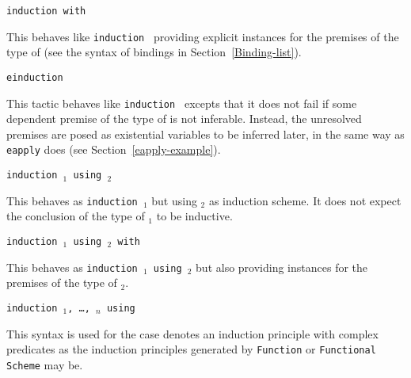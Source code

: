 \begin{coq_example*}
\begin{Variants}




\item{\tt induction {\term} with \bindinglist}

  This behaves like \texttt{induction {\term}} providing explicit
  instances for the premises of the type of {\term} (see the syntax of
  bindings in Section~\ref{Binding-list}).

\item{\tt einduction {\term}}

  This tactic behaves like \texttt{induction {\term}} excepts that it
  does not fail if some dependent premise of the type of {\term} is
  not inferable. Instead, the unresolved premises are posed as
  existential variables to be inferred later, in the same way as {\tt
  eapply} does (see Section~\ref{eapply-example}).

\item {\tt induction {\term$_1$} using {\term$_2$}}

  This behaves as {\tt induction {\term$_1$}} but using {\term$_2$} as
  induction scheme. It does not expect the conclusion of the type of
  {\term$_1$} to be inductive.

\item {\tt induction {\term$_1$} using {\term$_2$} with {\bindinglist}}

  This behaves as {\tt induction {\term$_1$} using {\term$_2$}} but
  also providing instances for the premises of the type of {\term$_2$}.

\item \texttt{induction {\term}$_1$, {\ldots}, {\term}$_n$ using {\qualid}}

  This syntax is used for the case {\qualid} denotes an induction principle
  with complex predicates as the induction principles generated by
  {\tt Function} or {\tt Functional Scheme} may be.


\end{Variants}
\end{coq_example*}
